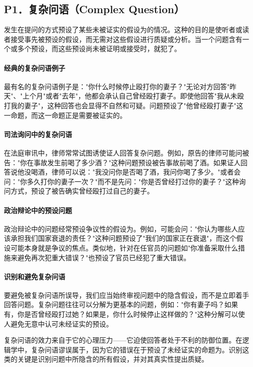 \subsection{P1．复杂问语（Complex Question）}

\begin{theorembox}[title=复杂问语谬误的定义]
发生在提问的方式预设了某些未被证实的假设为的情况。这种的目的是使听者或读者接受事先被预设的假设，而无需对这些假设进行质疑或分析。当一个问题含有一个或多个预设，而这些预设尚未被证明或接受时，就犯了。
\end{theorembox}

\paragraph{经典的复杂问语例子}
\begin{examplebox}[title=经典的复杂问语例子]
最有名的复杂问语例子是："你什么时候停止殴打你的妻子？"无论对方回答"昨天"、"上个月"或者"去年"，他都会承认自己曾经殴打妻子。即使他回答"我从未殴打我的妻子"，这种回答也会显得不自然和可疑。问题预设了"他曾经殴打妻子"这一命题，而这一命题正是需要被证实的。
\end{examplebox}

\paragraph{司法询问中的复杂问语}
\begin{examplebox}[title=司法询问中的复杂问语]
在法庭审讯中，律师常常试图诱使证人回答复杂问题。例如，原告的律师可能问被告："你在事故发生前喝了多少酒？"这种问题预设被告事故前喝了酒。如果证人回答说他没喝酒，律师可以说："我没问你是否喝了酒，我问你喝了多少。"或者会问："你多久打你的妻子一次？"而不是先问："你是否曾经打过你的妻子？"这种询问方式，预设了被告确实曾经殴打过自己的妻子。
\end{examplebox}

\paragraph{政治辩论中的预设问题}
\begin{examplebox}[title=政治辩论中的预设问题]
政治辩论中的问题经常预设争议性的假设为。例如，可能会问："你认为哪些人应该承担我们国家衰退的责任？"这种问题预设了"我们的国家正在衰退"，而这个假设可能本身就是争议的焦点。类似地，针对在任官员的问题如"你准备采取什么措施来避免再次犯重大错误？"也预设了官员已经犯了重大错误。
\end{examplebox}

\paragraph{识别和避免复杂问语}
要避免被复杂问语所误导，我们应当始终审视问题中的隐含假设，而不是立即着手回答问题。复杂问题往往可以分解为更基本的问题，例如："你有妻子吗？如果有，你是否曾经殴打过她？如果是，你什么时候停止这样做的？"这种分解可以使人避免无意中认可未经证实的预设。

复杂问语的效力来自于它的心理压力——它迫使回答者处于不利的防御位置。在逻辑学中，复杂问语谬误属于，因为它的错误在于预设了未经证实的命题为。识别这类的关键是识别问题中所隐含的所有假设，并对其真实性提出质疑。